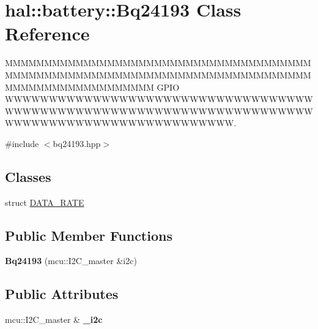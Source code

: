 \hypertarget{classhal_1_1battery_1_1_bq24193}{}\section{hal\+:\+:battery\+:\+:Bq24193 Class Reference}
\label{classhal_1_1battery_1_1_bq24193}


M\+M\+M\+M\+M\+M\+M\+M\+M\+M\+M\+M\+M\+M\+M\+M\+M\+M\+M\+M\+M\+M\+M\+M\+M\+M\+M\+M\+M\+M\+M\+M\+M\+M\+M\+M\+M\+M\+M\+M\+M\+M\+M\+M\+M\+M\+M\+M\+M\+M\+M\+M\+M\+M\+M\+M\+M\+M\+M\+M\+M\+M\+M\+M\+M\+M\+M\+M\+M\+M\+M\+M\+M\+M\+M\+M\+M\+M\+M\+M\+M\+M\+M\+M\+M\+M\+M\+M\+M\+M\+M\+M\+M\+M\+M\+M\+M G\+P\+I\+O W\+W\+W\+W\+W\+W\+W\+W\+W\+W\+W\+W\+W\+W\+W\+W\+W\+W\+W\+W\+W\+W\+W\+W\+W\+W\+W\+W\+W\+W\+W\+W\+W\+W\+W\+W\+W\+W\+W\+W\+W\+W\+W\+W\+W\+W\+W\+W\+W\+W\+W\+W\+W\+W\+W\+W\+W\+W\+W\+W\+W\+W\+W\+W\+W\+W\+W\+W\+W\+W\+W\+W\+W\+W\+W\+W\+W\+W\+W\+W\+W\+W\+W\+W\+W\+W\+W\+W\+W\+W\+W\+W\+W\+W\+W\+W.  




{\ttfamily \#include $<$bq24193.\+hpp$>$}

\subsection*{Classes}
\begin{DoxyCompactItemize}
\item 
struct \hyperlink{structhal_1_1battery_1_1_bq24193_1_1_d_a_t_a___r_a_t_e}{D\+A\+T\+A\+\_\+\+R\+A\+T\+E}
\end{DoxyCompactItemize}
\subsection*{Public Member Functions}
\begin{DoxyCompactItemize}
\item 
\hypertarget{classhal_1_1battery_1_1_bq24193_ae67ceabf3e8432f9da5e7b3aa1d2b092}{}{\bfseries Bq24193} (mcu\+::\+I2\+C\+\_\+master \&i2c)\label{classhal_1_1battery_1_1_bq24193_ae67ceabf3e8432f9da5e7b3aa1d2b092}

\end{DoxyCompactItemize}
\subsection*{Public Attributes}
\begin{DoxyCompactItemize}
\item 
\hypertarget{classhal_1_1battery_1_1_bq24193_a6e195436764831719658d5efd108efd7}{}mcu\+::\+I2\+C\+\_\+master \& {\bfseries \+\_\+i2c}\label{classhal_1_1battery_1_1_bq24193_a6e195436764831719658d5efd108efd7}

\end{DoxyCompactItemize}


